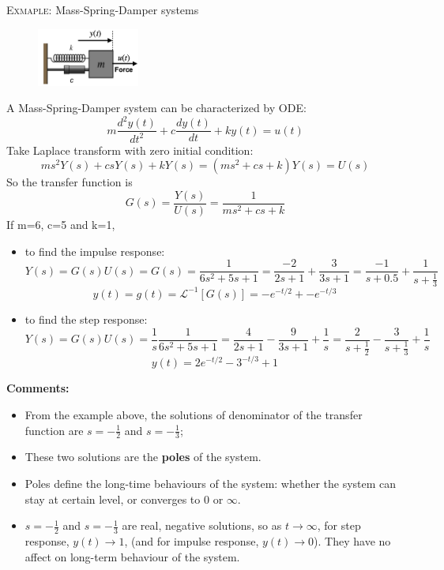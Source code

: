 \documentclass[12pt,a4paper]{article}
\begin{document}
\begin{tcolorbox}[breakable]
\textsc{Exmaple:} Mass-Spring-Damper systems
\begin{figure}[H] \centering
\includegraphics[width=0.3\textwidth]{images/MSD_system.png}
\end{figure}
A Mass-Spring-Damper system can be characterized by ODE:
\[ m\frac{d^{2}y(t)}{dt^{2}}+c\frac{dy(t)}{dt}+ky(t)=u(t) \] %
Take Laplace transform with zero initial condition:
\[ ms^{2}Y(s)+csY(s)+kY(s)=(ms^{2}+cs+k)Y(s)=U(s) \]
So the transfer function is 
\[ G(s)=\frac{Y(s)}{U(s)}= \frac{1}{ms^{2}+cs+k} \]
If m=6, c=5 and k=1, 
\begin{itemize}
\item to find the impulse response:
\[ Y(s) = G(s)U(s)  = G(s) = \frac{1}{6s^{2}+5s+1} = \frac{-2}{2s+1}+\frac{3}{3s+1}= \frac{-1}{s+0.5}+\frac{1}{s+\frac{1}{3}} \]
\[ y(t) = g(t) = \mathcal{L}^{-1} [G(s)] = -e^{-t/2}+-e^{-t/3} \]
\item to find the step response:
\[ Y(s) = G(s)U(s) = \frac{1}{s}\frac{1}{6s^{2}+5s+1} = \frac{4}{2s+1}-\frac{9}{3s+1} +\frac{1}{s} =  \frac{2}{s+\frac{1}{2}}-\frac{3}{s+\frac{1}{3}} +\frac{1}{s} \]
\[ y(t) = 2e^{-t/2}-3^{-t/3} +1 \]
\end{itemize}
\textbf{Comments:}
\begin{itemize}
 \item From the example above, the solutions of denominator of the transfer function are $s = -
 \frac{1}{2}$ and $s = -\frac{1}{3}$;
 \item These two solutions are the \textbf{poles} of the system. 
 \item Poles define the long-time behaviours of the system: whether the system can stay at certain level, or converges to 0 or $\infty$.
 \item $s = -\frac{1}{2}$ and $s = -\frac{1}{3}$ are real, negative solutions, so as $t\to \infty$, 
 for step response,  $y(t) \to 1$, (and for impulse response, $y(t) \to 0$). They have no affect on long-term behaviour of the system.
\end{itemize}
\end{tcolorbox}
\end{document}
